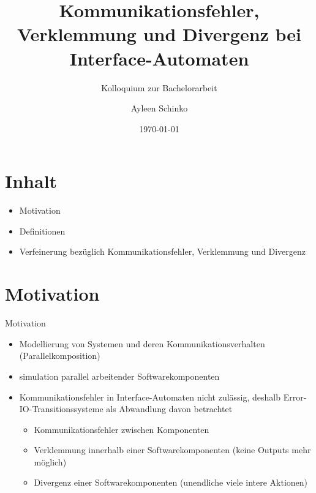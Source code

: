 \documentclass[mathserif]{beamer}
\title{Kommunikationsfehler, Verklemmung und Divergenz bei Interface-Automaten}
\subtitle{Kolloquium zur Bachelorarbeit}
\author{Ayleen Schinko}
\date{\today}
\begin{document}
\maketitle
\section{Inhalt}
\begin{frame}
  \begin{itemize}
      \item Motivation
      \item Definitionen
      \item Verfeinerung bezüglich Kommunikationsfehler, Verklemmung und
        Divergenz
  \end{itemize}
\end{frame}

\section{Motivation}
\begin{frame}
  \begin{center}
    \Large{Motivation}
  \end{center}
  \begin{itemize}
    \item Modellierung von Systemen und deren Kommunikationsverhalten
      (Parallelkomposition)
    \item simulation parallel arbeitender Softwarekomponenten
    \item Kommunikationsfehler in Interface-Automaten nicht zulässig, deshalb
      Error-IO-Transitionssysteme als Abwandlung davon betrachtet
      \begin{itemize}
        \item Kommunikationsfehler zwischen Komponenten
        \item Verklemmung innerhalb einer Softwarekomponenten (keine Outputs
          mehr möglich)
        \item Divergenz einer Softwarekomponenten (unendliche viele intere
          Aktionen)
      \end{itemize}
  \end{itemize}
\end{frame}
\end{document}
